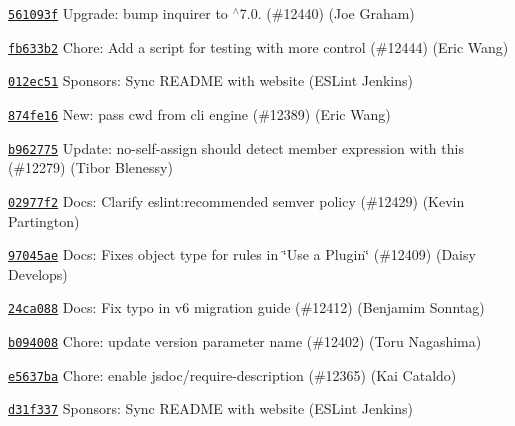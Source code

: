 \begin{DoxyItemize}
\item \href{https://github.com/eslint/eslint/commit/561093fc4267a4ae317d63bc9f103020fad88802}{\texttt{ {\ttfamily 561093f}}} Upgrade\+: bump inquirer to $^\wedge$7.0. (\#12440) (Joe Graham)
\item \href{https://github.com/eslint/eslint/commit/fb633b2bbd0a390b247047524fdd1f612dbab803}{\texttt{ {\ttfamily fb633b2}}} Chore\+: Add a script for testing with more control (\#12444) (Eric Wang)
\item \href{https://github.com/eslint/eslint/commit/012ec5151113a2be06fc0e4cd208d714e52dbc57}{\texttt{ {\ttfamily 012ec51}}} Sponsors\+: Sync R\+E\+A\+D\+ME with website (E\+S\+Lint Jenkins)
\item \href{https://github.com/eslint/eslint/commit/874fe1642a10a0fb937ccccdd4d22343b84f80dc}{\texttt{ {\ttfamily 874fe16}}} New\+: pass cwd from cli engine (\#12389) (Eric Wang)
\item \href{https://github.com/eslint/eslint/commit/b962775b8cb7c90985a5ab63e56744bb2ba79644}{\texttt{ {\ttfamily b962775}}} Update\+: no-\/self-\/assign should detect member expression with this (\#12279) (Tibor Blenessy)
\item \href{https://github.com/eslint/eslint/commit/02977f25a922dd0b8617c16116bb4364d0f30e94}{\texttt{ {\ttfamily 02977f2}}} Docs\+: Clarify {\ttfamily eslint\+:recommended} semver policy (\#12429) (Kevin Partington)
\item \href{https://github.com/eslint/eslint/commit/97045ae0805e6503887eef0b131dcb9e70b6d185}{\texttt{ {\ttfamily 97045ae}}} Docs\+: Fixes object type for {\ttfamily rules} in \char`\"{}\+Use a Plugin\char`\"{} (\#12409) (Daisy Develops)
\item \href{https://github.com/eslint/eslint/commit/24ca088fdc901feef8f10b050414fbde64b55c7d}{\texttt{ {\ttfamily 24ca088}}} Docs\+: Fix typo in v6 migration guide (\#12412) (Benjamim Sonntag)
\item \href{https://github.com/eslint/eslint/commit/b094008fb196dc1de5b4c27b7dbf0bcbb4b7b352}{\texttt{ {\ttfamily b094008}}} Chore\+: update version parameter name (\#12402) (Toru Nagashima)
\item \href{https://github.com/eslint/eslint/commit/e5637badd42f087d115f81575b832097fe6fe554}{\texttt{ {\ttfamily e5637ba}}} Chore\+: enable jsdoc/require-\/description (\#12365) (Kai Cataldo)
\item \href{https://github.com/eslint/eslint/commit/d31f3370396ec4868722bdc044aa697b135ac183}{\texttt{ {\ttfamily d31f337}}} Sponsors\+: Sync R\+E\+A\+D\+ME with website (E\+S\+Lint Jenkins)

\end{DoxyItemize}
